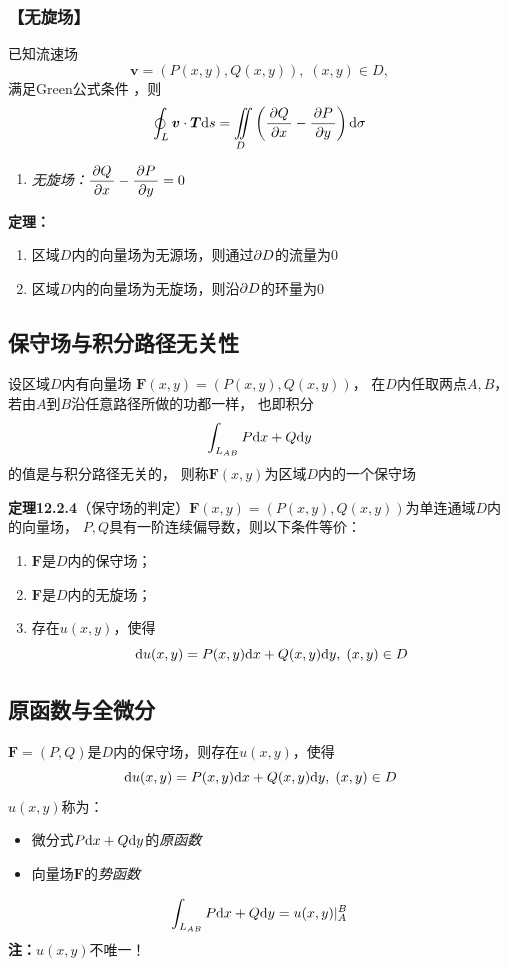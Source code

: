 \subsubsection{【无旋场】}

已知流速场
$$\bm{v}=(P(x,y),Q(x,y)),\;(x,y)\in D,$$
满足Green公式条件 ，则
$$\oint_L\bm{v}\cdot\bm{T}\mathrm{d} s=\iint\limits_D\left(
\displaystyle\frac{\,{\partial Q}\,}{\,{\partial x}\,}-\displaystyle\frac{\,{\partial P}\,}{\,{\partial y}\,}\right)\mathrm{d}\sigma $$
\begin{enumerate}[(1)]
  \setlength{\itemindent}{1cm}
  \addtocounter{enumi}{2}
  \item {\it 无旋场：}${\displaystyle\frac{\,{\partial Q}\,}{\,{\partial x}\,}-\displaystyle\frac{\,{\partial P}\,}{\,{\partial y}\,}=0}$
\end{enumerate}

{\bf 定理：}
\begin{enumerate}[(1)]
  \setlength{\itemindent}{1cm}
  \item 区域$D$内的向量场为无源场，则通过$\partial D$的流量为$0$
  \item 区域$D$内的向量场为无旋场，则沿$\partial D$的环量为$0$
\end{enumerate}

\subsection{保守场与积分路径无关性}

设区域$D$内有向量场
$\bm{F}(x,y)=(P(x,y),Q(x,y))$，
在$D$内任取两点$A,B$，若由$A$到$B$沿任意路径所做的功都一样，
也即积分
$$\displaystyle\int_{L_{AB}}P\mathrm{d} x+Q\mathrm{d} y$$
的值是与积分路径无关的，
则称$\bm{F}(x,y)$为区域$D$内的一个保守场

{\bf 定理12.2.4}（保守场的判定）$\bm{F}(x,y)=(P(x,y),Q(x,y))$为单连通域$D$内的向量场，
$P,Q$具有一阶连续偏导数，则以下条件等价：
\begin{enumerate}[(1)]
  \setlength{\itemindent}{1cm}
  \item $\bm{F}$是$D$内的保守场；
  \item $\bm{F}$是$D$内的无旋场；
  \item 存在$u(x,y)$，使得
  $$\mathrm{d} u(x,y)=P(x,y)\mathrm{d} x+Q(x,y)\mathrm{d} y,\;(x,y)\in D$$
\end{enumerate}

\subsection{原函数与全微分}

$\bm{F}=(P,Q)$是$D$内的保守场，则存在$u(x,y)$，使得
$$\mathrm{d} u(x,y)=P(x,y)\mathrm{d} x+Q(x,y)\mathrm{d} y,\;(x,y)\in D$$
 $u(x,y)$称为： 
\begin{itemize}
  \item 微分式$P\mathrm{d} x+Q\mathrm{d} y$的{\it 原函数} 
  \item 向量场$\bm{F}$的{\it 势函数} 
\end{itemize}
\bigskip
$${\displaystyle\int_{L_{AB}}P\mathrm{d} x+Q\mathrm{d} y=u(x,y)|_A^B} $$
{\bf 注：}$u(x,y)$不唯一！

